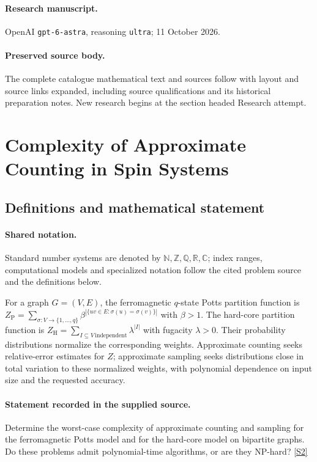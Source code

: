 \documentclass[11pt]{article}
\begin{document}
\paragraph{Research manuscript.} OpenAI \texttt{gpt-6-astra}, reasoning \texttt{ultra}; 11 October 2026.
\paragraph{Preserved source body.} The complete catalogue mathematical text and sources follow with layout and source links expanded, including source qualifications and its historical preparation notes. New research begins at the section headed Research attempt.

\section{Complexity of Approximate Counting in Spin Systems}\label{statement}

\subsection{Definitions and mathematical statement}

\paragraph{Shared notation.}Standard number systems are denoted by $\mathbb N,\mathbb Z,\mathbb Q,\mathbb R,\mathbb C$; index ranges, computational models and specialized notation follow the cited problem source and the definitions below.


For a graph $G=(V,E)$, the ferromagnetic $q$-state Potts partition function is $Z_{\mathrm P}=\sum_{\sigma:V\to\{1,\ldots,q\}}\beta^{|\{uv\in E:\sigma(u)=\sigma(v)\}|}$ with $\beta>1$. The hard-core partition function is $Z_{\mathrm H}=\sum_{I\subseteq V\,\mathrm{independent}}\lambda^{|I|}$ with fugacity $\lambda>0$. Their probability distributions normalize the corresponding weights. Approximate counting seeks relative-error estimates for $Z$; approximate sampling seeks distributions close in total variation to these normalized weights, with polynomial dependence on input size and the requested accuracy.
\paragraph{Statement recorded in the supplied source.}
Determine the worst-case complexity of approximate counting and sampling for the ferromagnetic Potts model and for the hard-core model on bipartite graphs. Do these problems admit polynomial-time algorithms, or are they NP-hard? \href{https://doi.org/10.4171/owr/2019/19}{[S2]}
\end{document}
